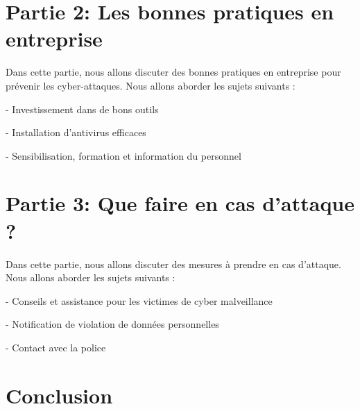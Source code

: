 \documentclass[a4paper,11pt]{article}
\begin{document}

\section{Partie 2: Les bonnes pratiques en entreprise}

Dans cette partie, nous allons discuter des bonnes pratiques en entreprise pour prévenir les cyber-attaques. Nous allons aborder les sujets suivants :

  - Investissement dans de bons outils

  - Installation d’antivirus efficaces

  - Sensibilisation, formation et information du personnel


\section{Partie 3: Que faire en cas d’attaque ?}

Dans cette partie, nous allons discuter des mesures à prendre en cas d’attaque. Nous allons aborder les sujets suivants :

  - Conseils et assistance pour les victimes de cyber malveillance

  - Notification de violation de données personnelles

  - Contact avec la police


\section{Conclusion}




\end{document}
